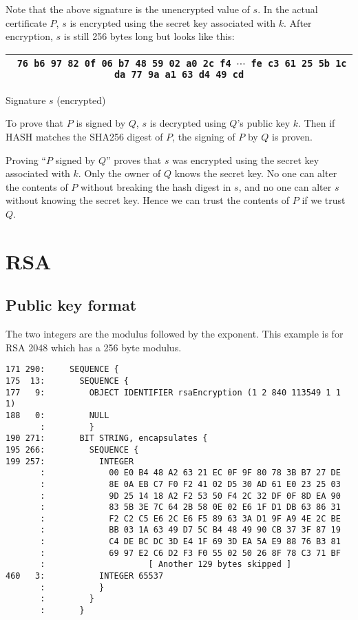 \documentclass[12pt]{article}
\begin{document}
\bigskip
\noindent
Note that the above signature is the unencrypted value of $s$.
In the actual certificate $P$, $s$ is encrypted using the secret key associated with $k$.
After encryption, $s$ is still 256 bytes long but looks like this:

\begin{center}
\begin{tabular}{|c|}
\hline
{\footnotesize\tt
76 b6 97 82 0f 06 b7 48 59 02 a0 2c f4 $\cdots$
fe c3 61 25 5b 1c da 77 9a a1 63 d4 49 cd}\\
\hline
\end{tabular}

\medskip
Signature $s$ (encrypted)
\end{center}

\noindent
To prove that $P$ is signed by $Q$, $s$ is decrypted using $Q$'s public key $k$.
Then if HASH matches the SHA256 digest of $P$, the signing of $P$ by $Q$ is proven.

\bigskip
\noindent
Proving ``$P$ signed by $Q$'' proves that $s$ was encrypted using the secret key associated with $k$.
Only the owner of $Q$ knows the secret key.
No one can alter the contents of $P$ without breaking the hash digest in $s$,
and no one can alter $s$ without knowing the secret key.
Hence we can trust the contents of $P$ if we trust $Q$.

\newpage
\section{RSA}

\subsection{Public key format}

\noindent
The two integers are the modulus followed by the exponent.
This example is for RSA 2048 which has a 256 byte modulus.

\begin{verbatim}
171 290:     SEQUENCE {
175  13:       SEQUENCE {
177   9:         OBJECT IDENTIFIER rsaEncryption (1 2 840 113549 1 1 1)
188   0:         NULL
       :         }
190 271:       BIT STRING, encapsulates {
195 266:         SEQUENCE {
199 257:           INTEGER
       :             00 E0 B4 48 A2 63 21 EC 0F 9F 80 78 3B B7 27 DE
       :             8E 0A EB C7 F0 F2 41 02 D5 30 AD 61 E0 23 25 03
       :             9D 25 14 18 A2 F2 53 50 F4 2C 32 DF 0F 8D EA 90
       :             83 5B 3E 7C 64 2B 58 0E 02 E6 1F D1 DB 63 86 31
       :             F2 C2 C5 E6 2C E6 F5 89 63 3A D1 9F A9 4E 2C BE
       :             BB 03 1A 63 49 D7 5C B4 48 49 90 CB 37 3F 87 19
       :             C4 DE BC DC 3D E4 1F 69 3D EA 5A E9 88 76 B3 81
       :             69 97 E2 C6 D2 F3 F0 55 02 50 26 8F 78 C3 71 BF
       :                     [ Another 129 bytes skipped ]
460   3:           INTEGER 65537
       :           }
       :         }
       :       }
\end{verbatim}
\end{document}
